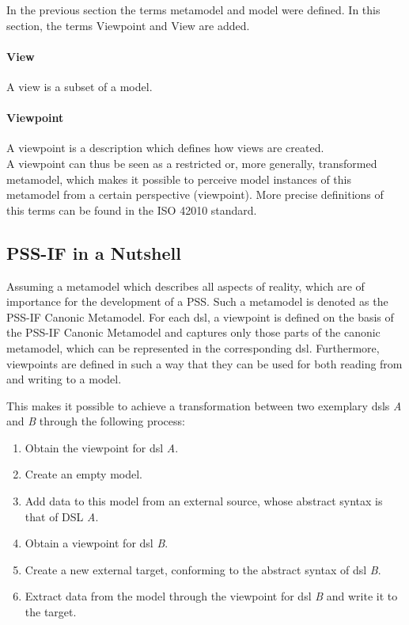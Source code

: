 In the previous section the terms metamodel and model were defined. In this section, the terms Viewpoint and View are added.

\paragraph{View} A view is a subset of a model.

\paragraph{Viewpoint} A viewpoint is a description which defines how views are created.\\

A viewpoint can thus be seen as a restricted or, more generally, transformed metamodel, which makes it possible to perceive model instances of this metamodel from a certain perspective (viewpoint). More precise definitions of this terms can be found in the ISO 42010 standard.

\subsection{PSS-IF in a Nutshell}
\label{sec:approach:pssif:nutshell}

Assuming a metamodel which describes all aspects of reality, which are of importance for the development of a \gls{PSS}. Such a metamodel is denoted as the PSS-IF Canonic Metamodel. For each \gls{dsl}, a viewpoint is defined on the basis of the PSS-IF Canonic Metamodel and captures only those parts of the canonic metamodel, which can be represented in the corresponding \gls{dsl}. Furthermore, viewpoints are defined in such a way that they can be used for both reading from and writing to a model.

This makes it possible to achieve a transformation between two exemplary \glspl{dsl} \textit{A} and \textit{B} through the following process:

\begin{enumerate}
\item Obtain the viewpoint for \gls{dsl} \textit{A}.
\item Create an empty model.
\item Add data to this model from an external source, whose abstract syntax is that of DSL \textit{A}.
\item Obtain a viewpoint for \gls{dsl} \textit{B}.
\item Create a new external target, conforming to the abstract syntax of \gls{dsl} \textit{B}.
\item Extract data from the model through the viewpoint for \gls{dsl} \textit{B} and write it to the target.
\end{enumerate}

